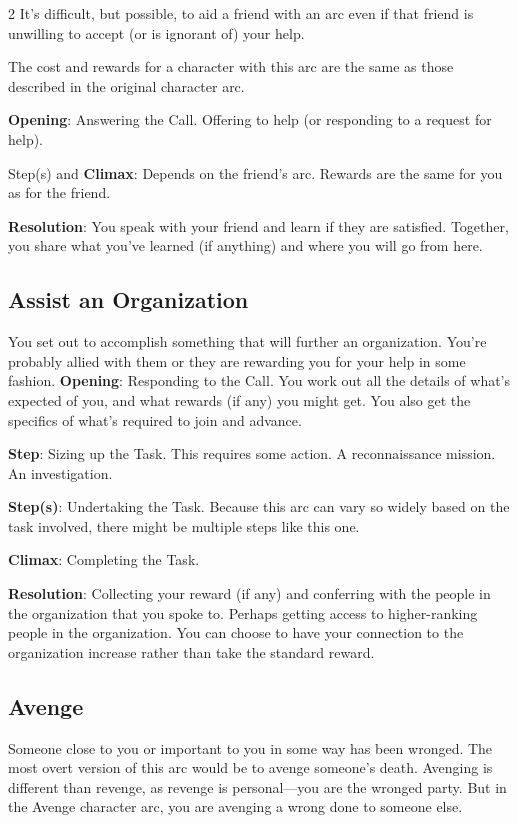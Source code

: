 \begin{multicols}{2}
It’s difficult, but possible, to aid a friend with an arc even if that friend is unwilling to accept (or is ignorant of) your help.

The cost and rewards for a character with this arc are the same as those described in the original character arc.

\textbf{Opening}: Answering the Call. Offering to help (or responding to a request for help).

Step(s) and \textbf{Climax}: Depends on the friend’s arc. Rewards are the same for you as for the friend.

\textbf{Resolution}: You speak with your friend and learn if they are satisfied. Together, you share what you’ve learned (if anything) and where you will go from here.

\subsection{Assist an Organization}

You set out to accomplish something that will further an organization. You’re probably allied with them or they are rewarding you for your help in some fashion.
\textbf{Opening}: Responding to the Call. You work out all the details of what’s expected of you, and what rewards (if any) you might get. You also get the specifics of what’s required to join and advance.

\textbf{Step}: Sizing up the Task. This requires some action. A reconnaissance mission. An investigation. 

\textbf{Step(s)}: Undertaking the Task. Because this arc can vary so widely based on the task involved, there might be multiple steps like this one. 

\textbf{Climax}: Completing the Task. 

\textbf{Resolution}: Collecting your reward (if any) and conferring with the people in the organization that you spoke to. Perhaps getting access to higher-ranking people in the organization. You can choose to have your connection to the organization increase rather than take the standard reward.

\subsection{Avenge}

Someone close to you or important to you in some way has been wronged. The most overt version of this arc would be to avenge someone’s death. Avenging is different than revenge, as revenge is personal—you are the wronged party. But in the Avenge character arc, you are avenging a wrong done to someone else.


\end{multicols}
